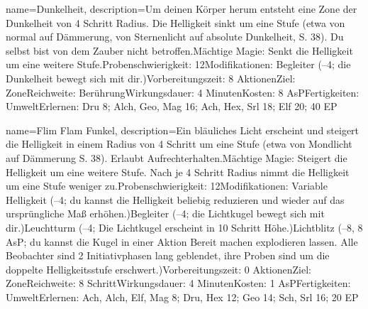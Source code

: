 {
    name={Dunkelheit},
    description={Um deinen Körper herum entsteht eine Zone der Dunkelheit von 4 Schritt Radius. Die Helligkeit sinkt um eine Stufe (etwa von normal auf Dämmerung, von Sternenlicht auf absolute Dunkelheit, S. 38). Du selbst bist von dem Zauber nicht betroffen.\newline Mächtige Magie: Senkt die Helligkeit um eine weitere Stufe.\newline Probenschwierigkeit: 12\newline Modifikationen: Begleiter (–4; die Dunkelheit bewegt sich mit dir.)\newline Vorbereitungszeit: 8 Aktionen\newline Ziel: Zone\newline Reichweite: Berührung\newline Wirkungsdauer: 4 Minuten\newline Kosten: 8 AsP\newline Fertigkeiten: Umwelt\newline Erlernen: Dru 8; Alch, Geo, Mag 16; Ach, Hex, Srl 18; Elf 20; 40 EP}
}


{
    name={Flim Flam Funkel},
    description={Ein bläuliches Licht erscheint und steigert die Helligkeit in einem Radius von 4 Schritt um eine Stufe (etwa von Mondlicht auf Dämmerung S. 38). Erlaubt Aufrechterhalten.\newline Mächtige Magie: Steigert die Helligkeit um eine weitere Stufe. Nach je 4 Schritt Radius nimmt die Helligkeit um eine Stufe weniger zu.\newline Probenschwierigkeit: 12\newline Modifikationen: Variable Helligkeit (–4; du kannst die Helligkeit beliebig reduzieren und wieder auf das ursprüngliche Maß erhöhen.)\newline Begleiter (–4; die Lichtkugel bewegt sich mit dir.)\newline Leuchtturm (–4; Die Lichtkugel erscheint in 10 Schritt Höhe.)\newline Lichtblitz (–8, 8 AsP; du kannst die Kugel in einer Aktion Bereit machen explodieren lassen. Alle Beobachter sind 2 Initiativphasen lang geblendet, ihre Proben sind um die doppelte Helligkeitsstufe erschwert.)\newline Vorbereitungszeit: 0 Aktionen\newline Ziel: Zone\newline Reichweite: 8 Schritt\newline Wirkungsdauer: 4 Minuten\newline Kosten: 1 AsP\newline Fertigkeiten: Umwelt\newline Erlernen: Ach, Alch, Elf, Mag 8; Dru, Hex 12;  Geo 14; Sch, Srl 16; 20 EP}
}


